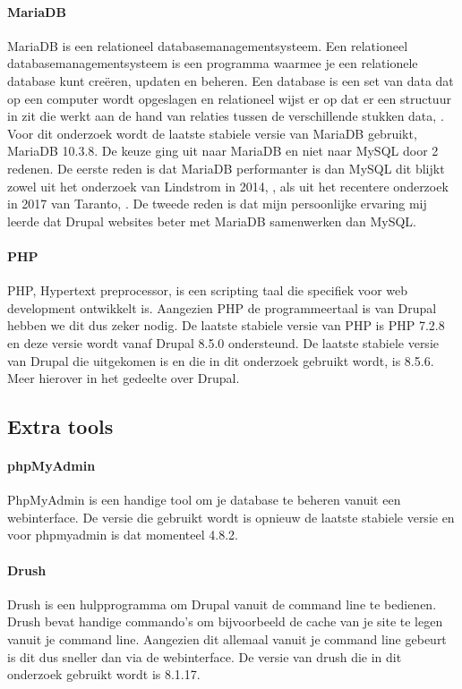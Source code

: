 \paragraph{MariaDB}
MariaDB is een relationeel databasemanagementsysteem. Een relationeel databasemanagementsysteem is een programma waarmee je een relationele database kunt creëren, updaten en beheren. Een database is een set van data dat op een computer wordt opgeslagen en relationeel wijst er op dat er een structuur in zit die werkt aan de hand van relaties tussen de verschillende stukken data, \autocite{RDBMS}. Voor dit onderzoek wordt de laatste stabiele versie van MariaDB gebruikt, MariaDB 10.3.8. De keuze ging uit naar MariaDB en niet naar MySQL door 2 redenen. De eerste reden is dat MariaDB performanter is dan MySQL dit blijkt zowel uit het onderzoek van Lindstrom in 2014, \autocite{Lindstrom2014}, als uit het recentere onderzoek in 2017 van Taranto, \autocite{Taranto2017}. De tweede reden is dat mijn persoonlijke ervaring mij leerde dat Drupal websites beter met MariaDB samenwerken dan MySQL.

\paragraph{PHP}
PHP, Hypertext preprocessor, is een scripting taal die specifiek voor web development ontwikkelt is. Aangezien PHP de programmeertaal is van Drupal hebben we dit dus zeker nodig. De laatste stabiele versie van PHP is PHP 7.2.8 en deze versie wordt vanaf Drupal 8.5.0 ondersteund. De laatste stabiele versie van Drupal die uitgekomen is en die in dit onderzoek gebruikt wordt, is 8.5.6. Meer hierover in het gedeelte over Drupal.

\subsection{Extra tools}
\paragraph{phpMyAdmin}
PhpMyAdmin is een handige tool om je database te beheren vanuit een webinterface. De versie die gebruikt wordt is opnieuw de laatste stabiele versie en voor phpmyadmin is dat momenteel 4.8.2.

\paragraph{Drush}
Drush is een hulpprogramma om Drupal vanuit de command line te bedienen. Drush bevat handige commando's om bijvoorbeeld de cache van je site te legen vanuit je command line. Aangezien dit allemaal vanuit je command line gebeurt is dit dus sneller dan via de webinterface. De versie van drush die in dit onderzoek gebruikt wordt is 8.1.17.

